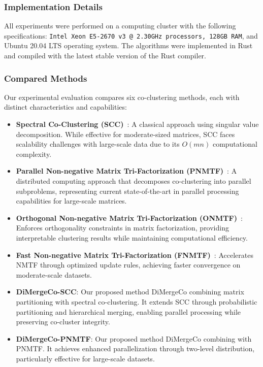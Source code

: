 \documentclass[journal]{IEEEtran}
\theoremstyle{definition}
\theoremstyle{remark} %
\renewcommand{\cite}[1]{~\autocite{#1}}
\begin{document}
\subsubsection{Implementation Details}
All experiments were performed on a computing cluster with the following specifications: \texttt{Intel Xeon E5-2670 v3 @ 2.30GHz processors, 128GB RAM}, and Ubuntu 20.04 LTS operating system. The algorithms were implemented in Rust and compiled with the latest stable version of the Rust compiler.

\subsubsection{Compared Methods}
Our experimental evaluation compares six co-clustering methods, each with distinct characteristics and capabilities:

\begin{itemize}
    \item \textbf{Spectral Co-Clustering (SCC)}\cite{dhillon2001CoclusteringDocumentsWords}:
          A classical approach using singular value decomposition. While effective for moderate-sized matrices, SCC faces scalability challenges with large-scale data due to its $O(mn)$ computational complexity.

    \item \textbf{Parallel Non-negative Matrix Tri-Factorization (PNMTF)}\cite{chen2023ParallelNonNegativeMatrix}:
          A distributed computing approach that decomposes co-clustering into parallel subproblems, representing current state-of-the-art in parallel processing capabilities for large-scale matrices.

    \item \textbf{Orthogonal Non-negative Matrix Tri-Factorization (ONMTF)}\cite{ding2006OrthogonalNonnegativeMatrix}:
          Enforces orthogonality constraints in matrix factorization, providing interpretable clustering results while maintaining computational efficiency.

    \item \textbf{Fast Non-negative Matrix Tri-Factorization (FNMTF)}\cite{kim2011FastNonnegativeMatrix}:
          Accelerates NMTF through optimized update rules, achieving faster convergence on moderate-scale datasets.

    \item \textbf{DiMergeCo-SCC}:
          Our proposed method DiMergeCo combining matrix partitioning with spectral co-clustering. It extends SCC through probabilistic partitioning and hierarchical merging, enabling parallel processing while preserving co-cluster integrity.

    \item \textbf{DiMergeCo-PNMTF}:
          Our proposed method DiMergeCo combining with PNMTF. It achieves enhanced parallelization through two-level distribution, particularly effective for large-scale datasets.
\end{itemize}
\end{document}
